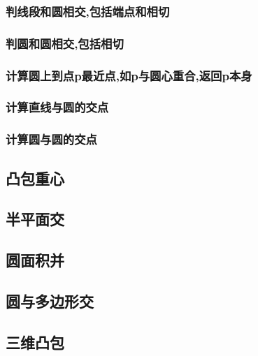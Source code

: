 \subsubsection{判线段和圆相交,包括端点和相切}

\subsubsection{判圆和圆相交,包括相切}

\subsubsection{计算圆上到点p最近点,如p与圆心重合,返回p本身}

\subsubsection{计算直线与圆的交点}

\subsubsection{计算圆与圆的交点}


\subsection{凸包重心}


\subsection{半平面交}


\subsection{圆面积并}


\subsection{圆与多边形交}


\subsection{三维凸包}

